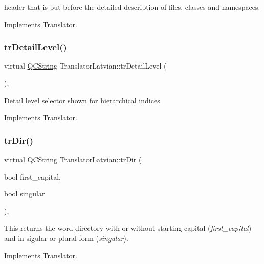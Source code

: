 header that is put before the detailed description of files, classes and namespaces. 

Implements \mbox{\hyperlink{class_translator}{Translator}}.

\mbox{\label{class_translator_latvian_a820efa2c530441f7cb95c7e670d1b153}} 
\subsubsection{\texorpdfstring{trDetailLevel()}{trDetailLevel()}}
{\footnotesize\ttfamily virtual \mbox{\hyperlink{class_q_c_string}{Q\+C\+String}} Translator\+Latvian\+::tr\+Detail\+Level (\begin{DoxyParamCaption}{ }\end{DoxyParamCaption})\hspace{0.3cm}{\ttfamily [inline]}, {\ttfamily [virtual]}}

Detail level selector shown for hierarchical indices 

Implements \mbox{\hyperlink{class_translator}{Translator}}.

\mbox{\label{class_translator_latvian_a864e383950c3b0a730b176e9d79dcc98}} 
\subsubsection{\texorpdfstring{trDir()}{trDir()}}
{\footnotesize\ttfamily virtual \mbox{\hyperlink{class_q_c_string}{Q\+C\+String}} Translator\+Latvian\+::tr\+Dir (\begin{DoxyParamCaption}\item[{bool}]{first\+\_\+capital,  }\item[{bool}]{singular }\end{DoxyParamCaption})\hspace{0.3cm}{\ttfamily [inline]}, {\ttfamily [virtual]}}

This returns the word directory with or without starting capital ({\itshape first\+\_\+capital}) and in sigular or plural form ({\itshape singular}). 

Implements \mbox{\hyperlink{class_translator}{Translator}}.

